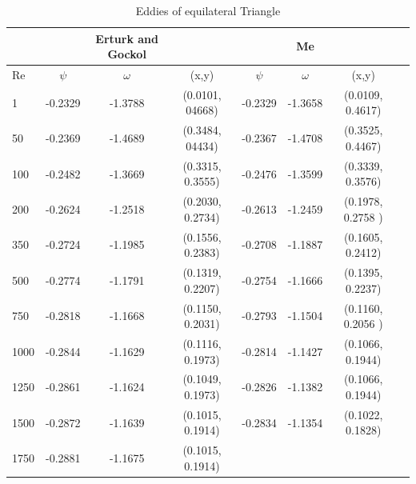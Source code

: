 \documentclass[a4paper,norsk]{article}
\begin{document}
\begin{table}
  \centering%
  \begin{tabular}{l*{6}{c}r}
   & &Erturk and Gockol & & & Me\\
   \hline 
  Re & $\psi$ & $\omega$ &(x,y) & $\psi$ & $\omega$ & (x,y)  \\
  1   &   -0.2329  &-1.3788  & (0.0101, 04668) &-0.2329 & -1.3658  & (0.0109, 0.4617)  \\
  50   &  -0.2369 & -1.4689 & (0.3484, 04434)  & -0.2367 &-1.4708 & (0.3525, 0.4467)    \\
  100  & -0.2482 & -1.3669 & (0.3315, 0.3555)   & -0.2476 & -1.3599 &(0.3339, 0.3576)  \\
  200   & -0.2624 &-1.2518  & (0.2030, 0.2734)  & -0.2613 & -1.2459 & (0.1978, 0.2758 ) \\
  350   & -0.2724 & -1.1985 & (0.1556, 0.2383) &-0.2708 & -1.1887 & (0.1605, 0.2412)   \\
  500   & -0.2774 & -1.1791 &  (0.1319, 0.2207)  & -0.2754 &  -1.1666 & (0.1395, 0.2237)       \\
  750   &  -0.2818 & -1.1668 &  (0.1150, 0.2031) & -0.2793  & -1.1504  & (0.1160, 0.2056 ) \\
  1000   & -0.2844 & -1.1629 &(0.1116, 0.1973) & -0.2814  & -1.1427 & (0.1066, 0.1944) \\
  1250   & -0.2861 & -1.1624 & (0.1049, 0.1973) & -0.2826 & -1.1382 & (0.1066, 0.1944)   \\
  1500   & -0.2872 & -1.1639 & (0.1015, 0.1914)  & -0.2834 & -1.1354  & (0.1022, 0.1828)\\
  1750   &  -0.2881 & -1.1675 & (0.1015, 0.1914) &   &\\ 
\hline
\end{tabular}
  \caption{Eddies of equilateral Triangle}\label{table:equilateral}
\end{table}
\end{document}
